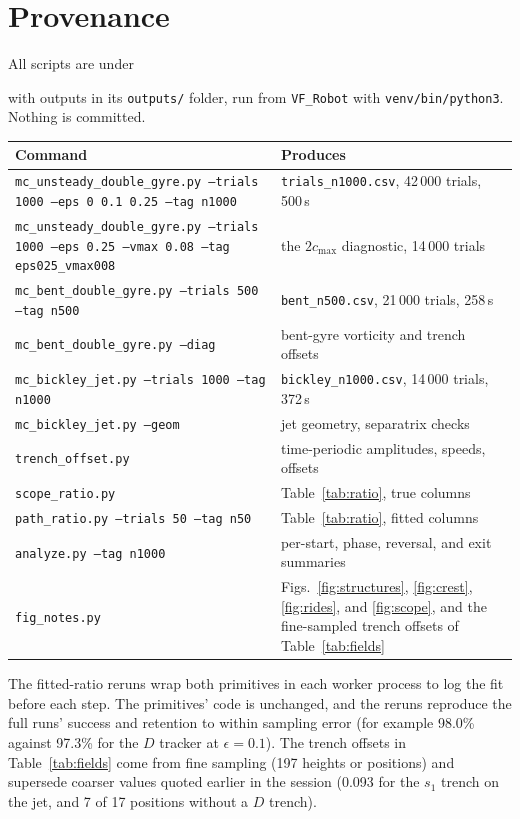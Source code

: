 \documentclass[11pt]{article}
\newcommand{\Dtr}{$D$ tracker}
\begin{document}
\section{Provenance}

All scripts are under
\begin{center}\small{}\end{center}
with outputs in its \texttt{outputs/} folder, run from \texttt{VF\_Robot}
with \texttt{venv/bin/python3}. Nothing is committed.

\begin{center}
\small
\begin{tabular}{p{}p{}}
\toprule
Command & Produces \\
\midrule
\texttt{mc\_unsteady\_double\_gyre.py --trials 1000 --eps 0 0.1 0.25 --tag n1000} & \texttt{trials\_n1000.csv}, 42\,000 trials, 500\,s \\
\texttt{mc\_unsteady\_double\_gyre.py --trials 1000 --eps 0.25 --vmax 0.08 --tag eps025\_vmax008} & the $2c_{\max}$ diagnostic, 14\,000 trials \\
\texttt{mc\_bent\_double\_gyre.py --trials 500 --tag n500} & \texttt{bent\_n500.csv}, 21\,000 trials, 258\,s \\
\texttt{mc\_bent\_double\_gyre.py --diag} & bent-gyre vorticity and trench offsets \\
\texttt{mc\_bickley\_jet.py --trials 1000 --tag n1000} & \texttt{bickley\_n1000.csv}, 14\,000 trials, 372\,s \\
\texttt{mc\_bickley\_jet.py --geom} & jet geometry, separatrix checks \\
\texttt{trench\_offset.py} & time-periodic amplitudes, speeds, offsets \\
\texttt{scope\_ratio.py} & Table~\ref{tab:ratio}, true columns \\
\texttt{path\_ratio.py --trials 50 --tag n50} & Table~\ref{tab:ratio}, fitted columns \\
\texttt{analyze.py --tag n1000} & per-start, phase, reversal, and exit summaries \\
\texttt{fig\_notes.py} & Figs.~\ref{fig:structures}, \ref{fig:crest}, \ref{fig:rides}, and \ref{fig:scope}, and the fine-sampled trench offsets of Table~\ref{tab:fields} \\
\bottomrule
\end{tabular}
\end{center}

The fitted-ratio reruns wrap both primitives in each worker process to log
the fit before each step. The primitives' code is unchanged, and the
reruns reproduce the full runs' success and retention to within sampling
error (for example 98.0\% against 97.3\% for the \Dtr{} at
$\epsilon = 0.1$). The trench offsets in Table~\ref{tab:fields} come from
fine sampling (197 heights or positions) and supersede coarser values
quoted earlier in the session (0.093 for the $s_1$ trench on the jet, and
7 of 17 positions without a $D$ trench).
\end{document}
